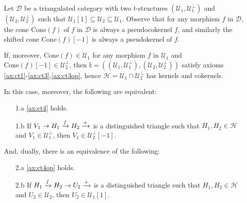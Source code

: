 \begin{example}\label{example_tria}
  Let $\mathcal{D}$ be a triangulated category with two $t$-structures
  $(\mathcal{U}_1,\mathcal{U}_1^\perp)$ and $(\mathcal{U}_2,\mathcal{U}_2^\perp)$ such that
  $\mathcal{U}_1[1]\subseteq\mathcal{U}_2\subseteq\mathcal{U}_1$. Observe that for any
  morphism $f$ in $\mathcal{D}$, the cone $\mathrm{Cone}(f)$ of $f$ in $\mathcal{D}$ is
  always a pseudocokernel $f$, and similarly the shifted cone $\mathrm{Cone}(f)[-1]$ is always
  a pseudokernel of $f$.

  If, moreover, $\mathrm{Cone}(f)\in\mathcal{U}_1$ for any morphism
  $f$ in $\mathcal{U}_1$ and $\mathrm{Cone}(f)[-1]\in\mathcal{U}_2^\perp$, then
  $\mathbb{t}=((\mathcal{U}_1,\mathcal{U}_1^\perp),(\mathcal{U}_2,\mathcal{U}_2^\perp))$ satisfy
  axioms \ref{ax:ct1}-\ref{ax:ct3},\ref{ax:ct3op}, hence $\mathcal{H}=\mathcal{U}_1\cap\mathcal{U}_2^\perp$ has
  kernels and cokernels.

  In this case, moreover, the following are equivalent:
  \begin{enumerate}
    \item[1.a] \ref{ax:ct4} holds.
    \item[1.b]\label{ax:eqb} If $V_1\to H_1\xrightarrow{f} H_2\xrightarrow{+}$ is a distinguished triangle such
    that $H_1, H_2\in\mathcal{H}$ and $V_1\in\mathcal{U}_1^\perp$, then $V_1\in\mathcal{U}_2^\perp[-1]$.
  \end{enumerate}
  And, dually, there is an equivalence of the following:
  \begin{enumerate}
    \item[2.a] \ref{ax:ct4op} holds.
    \item[2.b]\label{ax:eqa} If $H_1\xrightarrow{f}H_2\to U_2\xrightarrow{+}$ is a distinguished triangle such
    that $H_1,H_2\in\mathcal{H}$ and $U_2\in\mathcal{U}_2$, then $U_2\in\mathcal{U}_1[1]$.
  \end{enumerate}
\end{example}


